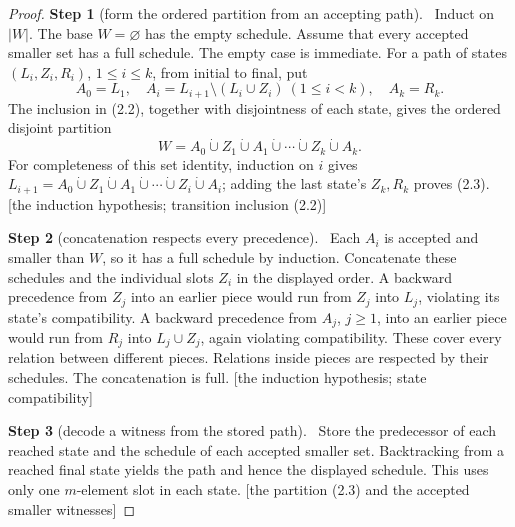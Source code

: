 \documentclass[11pt,a4paper]{article}
\theoremstyle{plain}
\theoremstyle{definition}
\newcommand{\step}[2]{\par\smallskip\noindent\textbf{Step #1} (#2).\ \ignorespaces}
\newcommand{\by}[1]{{\small[#1]}}
\begin{document}
\begin{proof}
\step{1}{form the ordered partition from an accepting path}
Induct on \(|W|\). The base \(W=\varnothing\) has the empty schedule. Assume that every accepted smaller set has a full schedule. The empty case is immediate. For a path of states \((L_i,Z_i,R_i)\), \(1\leq i\leq k\), from initial to final, put \[
A_0=L_1,\quad
A_i=L_{i+1}\setminus(L_i\cup Z_i)\ (1\leq i<k),\quad
A_k=R_k.
\] The inclusion in (2.2), together with disjointness of each state, gives the ordered disjoint partition \[
W=A_0\mathbin{\dot\cup}Z_1\mathbin{\dot\cup}A_1
\mathbin{\dot\cup}\cdots\mathbin{\dot\cup}Z_k\mathbin{\dot\cup}A_k.
\tag{2.3}
\] For completeness of this set identity, induction on \(i\) gives \(L_{i+1}=A_0\dot\cup Z_1\dot\cup A_1\dot\cup\cdots\dot\cup Z_i\dot\cup A_i\); adding the last state's \(Z_k,R_k\) proves (2.3).
\by{the induction hypothesis; transition inclusion (2.2)}

\step{2}{concatenation respects every precedence}
Each \(A_i\) is accepted and smaller than \(W\), so it has a full schedule by induction. Concatenate these schedules and the individual slots \(Z_i\) in the displayed order. A backward precedence from \(Z_j\) into an earlier piece would run from \(Z_j\) into \(L_j\), violating its state's compatibility. A backward precedence from \(A_j\), \(j\geq1\), into an earlier piece would run from \(R_j\) into \(L_j\cup Z_j\), again violating compatibility. These cover every relation between different pieces. Relations inside pieces are respected by their schedules. The concatenation is full.
\by{the induction hypothesis; state compatibility}

\step{3}{decode a witness from the stored path}
Store the predecessor of each reached state and the schedule of each accepted smaller set. Backtracking from a reached final state yields the path and hence the displayed schedule. This uses only one \(m\)-element slot in each state.
\by{the partition (2.3) and the accepted smaller witnesses}
\end{proof}
\end{document}
